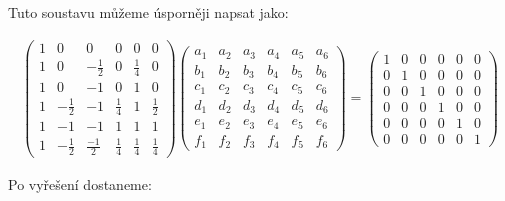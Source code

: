 \documentclass[../main.tex]{subfiles}
\begin{document}
Tuto soustavu můžeme úsporněji napsat jako:

\hfuzz=20pt
\begin{gather*}
    \left(\begin{matrix}
        1 & 0 & 0 & 0 & 0 & 0 \\
        1 & 0 & -\frac{1}{2} & 0 & \frac{1}{4} & 0 \\
        1 & 0 & -1 & 0 & 1 & 0 \\
        1 & -\frac{1}{2} & -1 & \frac{1}{4} & 1 & \frac{1}{2} \\
        1 & -1 & -1 & 1 & 1 & 1 \\
        1 & -\frac{1}{2} & \frac{-1}{2} & \frac{1}{4} & \frac{1}{4} & \frac{1}{4}
        \end{matrix}\right)
        \left(\begin{matrix}
            a_1 & a_2 & a_3 & a_4 & a_5 & a_6 \\
            b_1 & b_2 & b_3 & b_4 & b_5 & b_6 \\
            c_1 & c_2 & c_3 & c_4 & c_5 & c_6 \\
            d_1 & d_2 & d_3 & d_4 & d_5 & d_6 \\
            e_1 & e_2 & e_3 & e_4 & e_5 & e_6 \\
            f_1 & f_2 & f_3 & f_4 & f_5 & f_6 
            \end{matrix}\right)
        =
        \left(\begin{matrix}
            1 & 0 & 0 & 0 & 0 & 0 \\
            0 & 1 & 0 & 0 & 0 & 0 \\
            0 & 0 & 1 & 0 & 0 & 0 \\
            0 & 0 & 0 & 1 & 0 & 0 \\
            0 & 0 & 0 & 0 & 1 & 0 \\
            0 & 0 & 0 & 0 & 0 & 1
            \end{matrix}\right)
\end{gather*}
\hfuzz=0pt

Po vyřešení dostaneme: 
\end{document}
